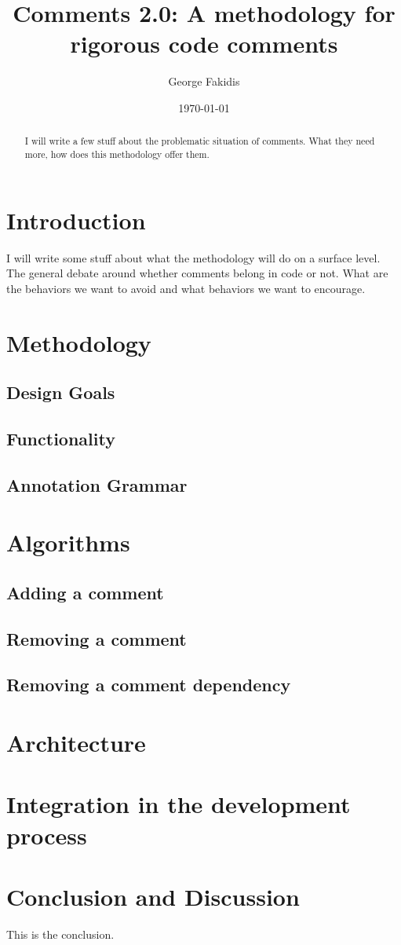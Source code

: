 \documentclass[12pt,a4paper]{article}
\title{Comments 2.0: A methodology for rigorous code comments}
\author{George Fakidis}
\date{\today}
\begin{document}
\maketitle

\begin{abstract}
	I will write a few stuff about the problematic situation of comments. What they need more, how does this methodology offer them. 
\end{abstract}

\section{Introduction}
I will write some stuff about what the methodology will do on a surface level. The general debate around whether comments belong in code or not. What are the behaviors we want to avoid and what behaviors we want to encourage.

\section{Methodology}
\subsection{Design Goals}
\subsection{Functionality}
\subsection{Annotation Grammar}

\section{Algorithms}
\subsection{Adding a comment}
\subsection{Removing a comment}
\subsection{Removing a comment dependency}

\section{Architecture}

\section{Integration in the development process}

\section{Conclusion and Discussion}

This is the conclusion.
\end{document}
